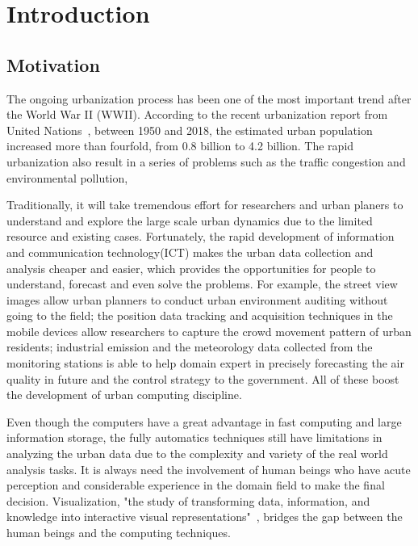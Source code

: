 \chapter{Introduction}\label{chap:intro}

\section{Motivation}
The ongoing urbanization process has been one of the most important trend after the World War II (WWII). According to the recent urbanization report from United Nations~\cite{error}, between 1950 and 2018, the estimated urban population increased more than fourfold, from 0.8 billion to 4.2 billion. The rapid urbanization also result in a series of problems such as the traffic congestion and environmental pollution,  

Traditionally, it will take tremendous effort for researchers and urban planers to understand and explore the large scale urban dynamics due to the limited resource and existing cases. 
Fortunately, the rapid development of information and communication technology(ICT) makes the urban data collection and analysis cheaper and easier, which provides the opportunities for people to understand, forecast and even solve the problems. For example, the street view images allow urban planners to conduct urban environment auditing without going to the field; the position data tracking and acquisition techniques  in the mobile devices allow researchers to capture the crowd movement pattern of urban residents; industrial emission and the meteorology data collected from the monitoring stations is able to help domain expert in precisely forecasting the air quality in future and  the control strategy to the government. 
All of these boost the development of urban computing discipline.  

Even though the computers have a great advantage in fast computing and large information storage, the fully automatics techniques still have limitations in analyzing the urban data due to the complexity and variety of the real world analysis tasks.  It is always need the involvement of human beings who have acute perception and considerable experience in the domain field to make the final decision. Visualization, "the study of transforming data, information, and knowledge into interactive visual representations"~\cite{liu2014survey}, bridges the gap between the human beings and the computing techniques.

